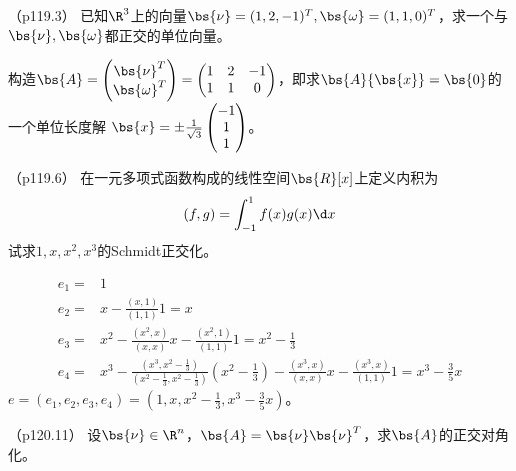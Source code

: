 \documentclass[12pt, a4paper, oneside, UTF8]{ctexbook}
\begin{document}
\begin{question}（p119.3）
    已知$\R^3$上的向量$\bs{\nu}=(1,2,-1)^T,\bs{\omega}=(1,1,0)^T$，求一个与$\bs{\nu},\bs{\omega}$都正交的单位向量。
\end{question}


\begin{solution}
    构造$\bs{A}=\begin{pmatrix}
        \bs{\nu}^T\\
        \bs{\omega}^T
    \end{pmatrix}=\begin{pmatrix}
        1 & 2 & -1\\
        1 & 1 & 0
    \end{pmatrix}$，即求$\bs{A}{\bs{x}}=\bs{0}$的一个单位长度解
    $\bs{x}=\pm \frac{1}{\sqrt{3}}\begin{pmatrix}
        -1 \\
        1 \\
        1
    \end{pmatrix}$。

\end{solution}


\begin{question}（p119.6）
    在一元多项式函数构成的线性空间$\bs{R}[x]$上定义内积为
    \begin{align*}
        (f,g)=\int_{-1}^1 f(x)g(x) \d x
    \end{align*}
    试求$1,x,x^2,x^3$的Schmidt正交化。
\end{question}

\begin{solution}
    \begin{align*}
        e_1=&1 \\
        e_2=&x-\frac{(x,1)}{(1,1)} 1 =x \\
        e_3=&x^2-\frac{(x^2,x)}{(x,x)}x-\frac{(x^2,1)}{(1,1)} 1=x^2-\frac{1}{3} \\
        e_4=&x^3-\frac{(x^3,x^2-\frac{1}{3})}{(x^2-\frac{1}{3},x^2-\frac{1}{3})}(x^2-\frac{1}{3})-
        \frac{(x^3,x)}{(x,x)}x-\frac{(x^3,x)}{(1,1)}1=x^3-\frac{3}{5}x
    \end{align*}
    $e=(e_1,e_2,e_3,e_4)=(1,x,x^2-\frac{1}{3},x^3-\frac{3}{5}x)$。

\end{solution}

\begin{question}（p120.11）
    设$\bs{\nu}\in \R^n$，$\bs{A}=\bs{\nu}\bs{\nu}^T$，求$\bs{A}$的正交对角化。
\end{question}
\end{document}

